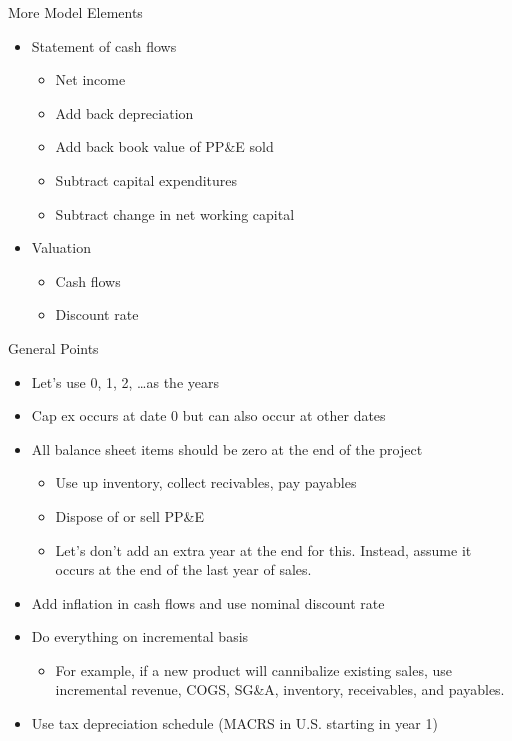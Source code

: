 \documentclass[10pt]{beamer}
\begin{document}
\begin{frame}{More Model Elements}
    \begin{itemize}
    \item Statement of cash flows
    \begin{itemize}
        \item Net income
        \item Add back depreciation
        \item Add back book value of PP\&E sold
        \item Subtract capital expenditures
        \item Subtract change in net working capital
    \end{itemize}
    \item Valuation   
    \begin{itemize}
        \item Cash flows
        \item Discount rate
    \end{itemize}
    \end{itemize}
    
\end{frame}

\begin{frame}{General Points}
    \begin{itemize}
    \item Let's use 0, 1, 2, \ldots as the years
    \item Cap ex occurs at date 0 but can also occur at other dates
    \item All balance sheet items should be zero at the end of the project
    \begin{itemize}
        \item Use up inventory, collect recivables, pay payables
        \item Dispose of or sell PP\&E
        \item Let's don't add an extra year at the end for this.  Instead, assume it occurs at the end of the last year of sales.
     \end{itemize}
     \item Add inflation in cash flows and use nominal discount rate
     \item Do everything on incremental basis
     \begin{itemize}
     \item For example, if a new product will cannibalize existing sales, use incremental revenue, COGS, SG\&A, inventory, receivables, and payables.
     \end{itemize}
     \item Use tax depreciation schedule (MACRS in U.S. starting in year 1)
    \end{itemize}
\end{frame}
\end{document}
